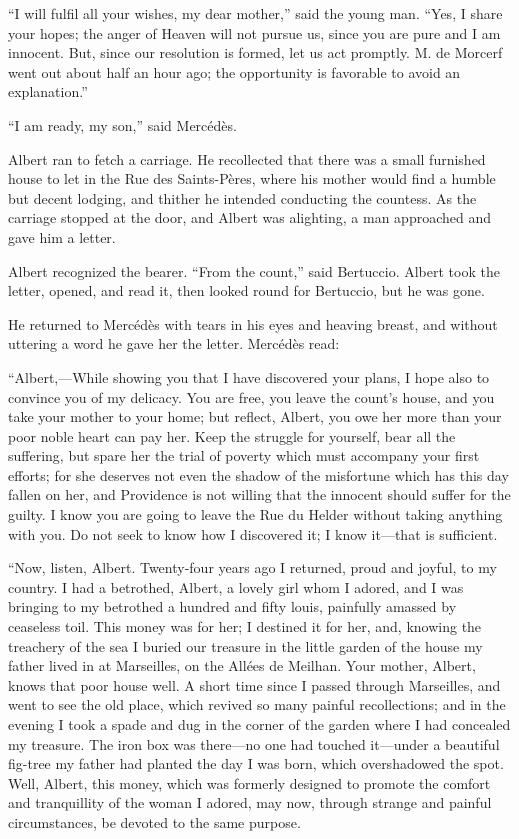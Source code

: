 “I will fulfil all your wishes, my dear mother,” said the young man.
“Yes, I share your hopes; the anger of Heaven will not pursue us, since
you are pure and I am innocent. But, since our resolution is formed,
let us act promptly. M. de Morcerf went out about half an hour ago; the
opportunity is favorable to avoid an explanation.”

“I am ready, my son,” said Mercédès.

Albert ran to fetch a carriage. He recollected that there was a small
furnished house to let in the Rue des Saints-Pères, where his mother
would find a humble but decent lodging, and thither he intended
conducting the countess. As the carriage stopped at the door, and
Albert was alighting, a man approached and gave him a letter.

Albert recognized the bearer. “From the count,” said Bertuccio. Albert
took the letter, opened, and read it, then looked round for Bertuccio,
but he was gone.

He returned to Mercédès with tears in his eyes and heaving breast, and
without uttering a word he gave her the letter. Mercédès read:

“Albert,—While showing you that I have discovered your plans, I hope
also to convince you of my delicacy. You are free, you leave the
count’s house, and you take your mother to your home; but reflect,
Albert, you owe her more than your poor noble heart can pay her. Keep
the struggle for yourself, bear all the suffering, but spare her the
trial of poverty which must accompany your first efforts; for she
deserves not even the shadow of the misfortune which has this day
fallen on her, and Providence is not willing that the innocent should
suffer for the guilty. I know you are going to leave the Rue du Helder
without taking anything with you. Do not seek to know how I discovered
it; I know it—that is sufficient.

“Now, listen, Albert. Twenty-four years ago I returned, proud and
joyful, to my country. I had a betrothed, Albert, a lovely girl whom I
adored, and I was bringing to my betrothed a hundred and fifty louis,
painfully amassed by ceaseless toil. This money was for her; I destined
it for her, and, knowing the treachery of the sea I buried our treasure
in the little garden of the house my father lived in at Marseilles, on
the Allées de Meilhan. Your mother, Albert, knows that poor house well.
A short time since I passed through Marseilles, and went to see the old
place, which revived so many painful recollections; and in the evening
I took a spade and dug in the corner of the garden where I had
concealed my treasure. The iron box was there—no one had touched
it—under a beautiful fig-tree my father had planted the day I was born,
which overshadowed the spot. Well, Albert, this money, which was
formerly designed to promote the comfort and tranquillity of the woman
I adored, may now, through strange and painful circumstances, be
devoted to the same purpose.

